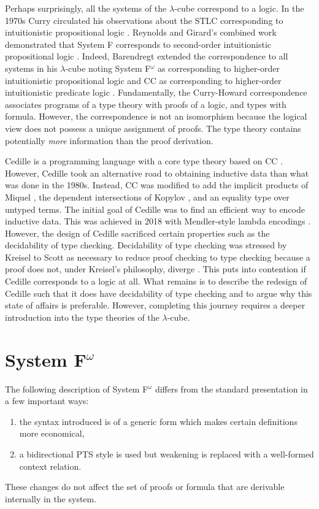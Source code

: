 Perhaps surprisingly, all the systems of the $\lambda$-cube correspond to a logic.
In the 1970s Curry circulated his observations about the STLC corresponding to intuitionistic propositional logic \cite{howard1980}.
Reynolds and Girard's combined work demonstrated that System F corresponds to second-order intuitionistic propositional logic \cite{girard1972,reynolds1974_systemf,reynolds1983}.
Indeed, Barendregt extended the correspondence to all systems in his $\lambda$-cube noting System F$^\omega$ as corresponding to higher-order intuitionistic propositional logic and CC as corresponding to higher-order intuitionistic predicate logic \cite{barendregt1991_pts}.
Fundamentally, the Curry-Howard correspondence associates programs of a type theory with proofs of a logic, and types with formula.
However, the correspondence is not an isomorphism because the logical view does not possess a unique assignment of proofs.
The type theory contains potentially \textit{more} information than the proof derivation.

Cedille is a programming language with a core type theory based on CC \cite{stump2017_cdle,stump2021_cedillecore}.
However, Cedille took an alternative road to obtaining inductive data than what was done in the 1980s.
Instead, CC was modified to add the implicit products of Miquel \cite{miquel2001}, the dependent intersections of Kopylov \cite{kopylov2003}, and an equality type over untyped terms.
The initial goal of Cedille was to find an efficient way to encode inductive data.
This was achieved in 2018 with Mendler-style lambda encodings \cite{firsov2018_mendler}. 
However, the design of Cedille sacrificed certain properties such as the decidability of type checking.
Decidability of type checking was stressed by Kreisel to Scott as necessary to reduce proof checking to type checking because a proof does not, under Kreisel's philosophy, diverge \cite{scott1970}.
This puts into contention if Cedille corresponds to a logic at all.
What remains is to describe the redesign of Cedille such that it does have decidability of type checking and to argue why this state of affairs is preferable.
However, completing this journey requires a deeper introduction into the type theories of the $\lambda$-cube.

\section{System F$^\omega$}

The following description of System F$^\omega$ differs from the standard presentation in a few important ways:
\begin{enumerate}
    \item the syntax introduced is of a generic form which makes certain definitions more economical,
    \item a bidirectional PTS style is used but weakening is replaced with a well-formed context relation.
\end{enumerate}
These changes do not affect the set of proofs or formula that are derivable internally in the system.

